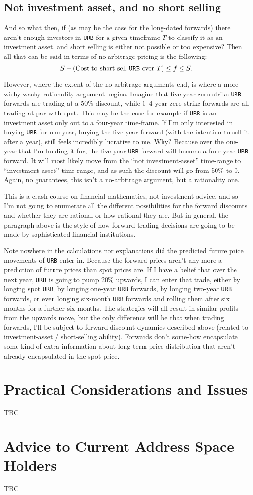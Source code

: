 \documentclass{article}
\begin{document}
	\subsection{Not investment asset, and no short selling}
	And so what then, if (as may be the case for the long-dated forwards) there aren't enough investors in \texttt{URB} for a given timeframe $T$ to classify it as an investment asset, and short selling is either not possible or too expensive? Then all that can be said in terms of no-arbitrage pricing is the following:
	\begin{equation}
		S - (\text{Cost to short sell \texttt{URB} over }T)\leq f \leq S.
	\end{equation}
	
	However, where the extent of the no-arbitrage arguments end, is where a more wishy-washy rationality argument begins. Imagine that five-year zero-strike \texttt{URB} forwards are trading at a 50\% discount, while 0--4 year zero-strike forwards are all trading at par with spot. This may be the case for example if \texttt{URB} is an investment asset only out to a four-year time-frame. If I'm only interested in buying \texttt{URB} for one-year, buying the five-year forward (with the intention to sell it after a year), still feels incredibly lucrative to me. Why? Because over the one-year that I'm holding it for, the five-year \texttt{URB} forward will become a four-year \texttt{URB} forward. It will most likely move from the ``not investment-asset'' time-range to ``investment-asset'' time range, and as such the discount will go from 50\% to 0. Again, no guarantees, this isn't a no-arbitrage argument, but a rationality one.
	
	This is a crash-course on financial mathematics, not investment advice, and so I'm not going to enumerate all the different possibilities for the forward discounts and whether they are rational or how rational they are. But in general, the paragraph above is the style of how forward trading decisions are going to be made by sophisticated financial institutions.
	
	Note nowhere in the calculations nor explanations did the predicted future price movements of \texttt{URB} enter in. Because the forward prices aren't any more a prediction of future prices than spot prices are. If I have a belief that over the next year, \texttt{URB} is going to pump 20\% upwards, I can enter that trade, either by longing spot \texttt{URB}, by longing one-year \texttt{URB} forwards, by longing two-year \texttt{URB} forwards, or even longing six-month \texttt{URB} forwards and rolling them after six months for a further six months. The strategies will all result in similar profits from the upwards move, but the only difference will be that when trading forwards, I'll be subject to forward discount dynamics described above (related to investment-asset / short-selling ability). Forwards don't some-how encapsulate some kind of extra information about long-term price-distribution that aren't already encapsulated in the spot price.
	
	\section{Practical Considerations and Issues}
	TBC
	
	\section{Advice to Current Address Space Holders}
	TBC

	\printbibliography
\end{document}
